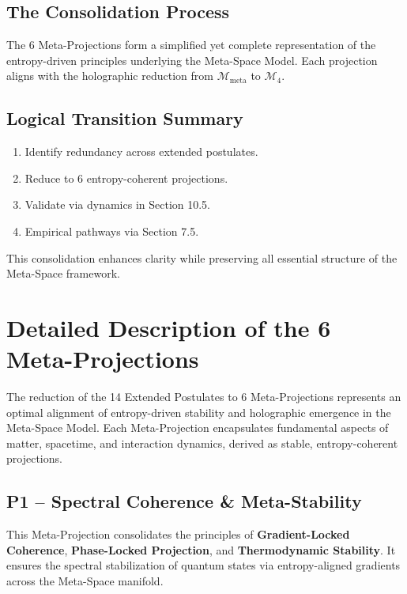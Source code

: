 \documentclass[10.5pt,a4paper]{article}
\begin{document}
\subsection{The Consolidation Process}

The 6 Meta-Projections form a simplified yet complete representation of the entropy-driven principles underlying the Meta-Space Model. Each projection aligns with the holographic reduction from \( \mathcal{M}_{\text{meta}} \) to \( \mathcal{M}_4 \).

\subsection{Logical Transition Summary}

\begin{enumerate}
    \item Identify redundancy across extended postulates.
    \item Reduce to 6 entropy-coherent projections.
    \item Validate via dynamics in Section 10.5.
    \item Empirical pathways via Section 7.5.
\end{enumerate}

This consolidation enhances clarity while preserving all essential structure of the Meta-Space framework.

\clearpage

\section{Detailed Description of the 6 Meta-Projections}

The reduction of the 14 Extended Postulates to 6 Meta-Projections represents an optimal alignment of entropy-driven 
stability and holographic emergence in the Meta-Space Model. Each Meta-Projection encapsulates fundamental aspects 
of matter, spacetime, and interaction dynamics, derived as stable, entropy-coherent projections.

\subsection{P1 – Spectral Coherence \& Meta-Stability}

This Meta-Projection consolidates the principles of \textbf{Gradient-Locked Coherence}, 
\textbf{Phase-Locked Projection}, and \textbf{Thermodynamic Stability}. 
It ensures the spectral stabilization of quantum states via entropy-aligned gradients across the Meta-Space manifold.
\end{document}

